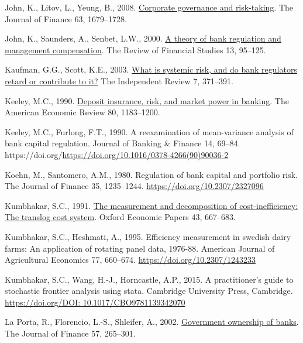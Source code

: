 \documentclass[
  letterpaper,
  DIV=11,
  numbers=noendperiod]{scrreprt}
\newlength{\cslhangindent}
\newenvironment{CSLReferences}[2] %
 {\begin{list}{}{%
  \setlength{\itemindent}{0pt}
  \setlength{\leftmargin}{0pt}
  \setlength{\parsep}{0pt}
  \ifodd #1
   \setlength{\leftmargin}{\cslhangindent}
   \setlength{\itemindent}{-1\cslhangindent}
  \fi
  \setlength{\itemsep}{#2\baselineskip}}}
 {\end{list}}
\begin{document}
\begin{CSLReferences}{1}{0}
John, K., Litov, L., Yeung, B., 2008.
\href{http://www.jstor.org.queens.ezp1.qub.ac.uk/stable/25094487}{Corporate
governance and risk-taking}. The Journal of Finance 63, 1679--1728.

John, K., Saunders, A., Senbet, L.W., 2000.
\href{http://www.jstor.org.queens.ezp1.qub.ac.uk/stable/2646082}{A
theory of bank regulation and management compensation}. The Review of
Financial Studies 13, 95--125.

Kaufman, G.G., Scott, K.E., 2003.
\href{http://www.jstor.org/stable/24562449}{What is systemic risk, and
do bank regulators retard or contribute to it?} The Independent Review
7, 371--391.

Keeley, M.C., 1990.
\href{http://www.jstor.org.queens.ezp1.qub.ac.uk/stable/2006769}{Deposit
insurance, risk, and market power in banking}. The American Economic
Review 80, 1183--1200.

Keeley, M.C., Furlong, F.T., 1990. A reexamination of mean-variance
analysis of bank capital regulation. Journal of Banking \& Finance 14,
69--84.
https://doi.org/\url{https://doi.org/10.1016/0378-4266(90)90036-2}

Koehn, M., Santomero, A.M., 1980. Regulation of bank capital and
portfolio risk. The Journal of Finance 35, 1235--1244.
\url{https://doi.org/10.2307/2327096}

Kumbhakar, S.C., 1991. \href{http://www.jstor.org/stable/2663415}{The
measurement and decomposition of cost-inefficiency: The translog cost
system}. Oxford Economic Papers 43, 667--683.

Kumbhakar, S.C., Heshmati, A., 1995. Efficiency measurement in swedish
dairy farms: An application of rotating panel data, 1976-88. American
Journal of Agricultural Economics 77, 660--674.
\url{https://doi.org/10.2307/1243233}

Kumbhakar, S.C., Wang, H.-J., Horncastle, A.P., 2015. A practitioner's
guide to stochastic frontier analysis using stata. Cambridge University
Press, Cambridge.
\href{https://doi.org/DOI:\%2010.1017/CBO9781139342070}{https://doi.org/DOI:
10.1017/CBO9781139342070}

La Porta, R., Florencio, L.-S., Shleifer, A., 2002.
\href{http://www.jstor.org.queens.ezp1.qub.ac.uk/stable/2697840}{Government
ownership of banks}. The Journal of Finance 57, 265--301.


\end{CSLReferences}
\end{document}
